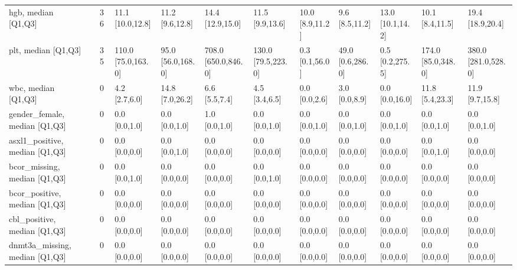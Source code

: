 \begin{tabular}{llllllllllll}
hgb, median [Q1,Q3] &    &                   36 &    11.1 [10.0,12.8] &    11.2 [9.6,12.8] &     14.4 [12.9,15.0] &     11.5 [9.9,13.6] &   10.0 [8.9,11.2] &    9.6 [8.5,11.2] &  13.0 [10.1,14.2] &     10.1 [8.4,11.5] &     19.4 [18.9,20.4] \\
plt, median [Q1,Q3] &    &                   35 &  110.0 [75.0,163.0] &  95.0 [56.0,168.0] &  708.0 [650.0,846.0] &  130.0 [79.5,223.0] &    0.3 [0.1,56.0] &  49.0 [0.6,286.0] &   0.5 [0.2,275.5] &  174.0 [85.0,348.0] &  380.0 [281.0,528.0] \\
wbc, median [Q1,Q3] &    &                    0 &       4.2 [2.7,6.0] &    14.8 [7.0,26.2] &        6.6 [5.5,7.4] &       4.5 [3.4,6.5] &     0.0 [0.0,2.6] &     3.0 [0.0,8.9] &    0.0 [0.0,16.0] &     11.8 [5.4,23.3] &      11.9 [9.7,15.8] \\
gender\_female, median [Q1,Q3] &    &                    0 &       0.0 [0.0,1.0] &      0.0 [0.0,1.0] &        1.0 [0.0,1.0] &       0.0 [0.0,1.0] &     0.0 [0.0,1.0] &     0.0 [0.0,1.0] &     0.0 [0.0,1.0] &       0.0 [0.0,1.0] &        0.0 [0.0,1.0] \\
asxl1\_positive, median [Q1,Q3] &    &                    0 &       0.0 [0.0,0.0] &      0.0 [0.0,1.0] &        0.0 [0.0,0.0] &       0.0 [0.0,0.0] &     0.0 [0.0,0.0] &     0.0 [0.0,0.0] &     0.0 [0.0,0.0] &       0.0 [0.0,1.0] &        0.0 [0.0,0.0] \\
bcor\_missing, median [Q1,Q3] &    &                    0 &       0.0 [0.0,1.0] &      0.0 [0.0,0.0] &        0.0 [0.0,0.0] &       0.0 [0.0,1.0] &     0.0 [0.0,0.0] &     0.0 [0.0,0.0] &     0.0 [0.0,0.0] &       0.0 [0.0,0.0] &        0.0 [0.0,0.0] \\
bcor\_positive, median [Q1,Q3] &    &                    0 &       0.0 [0.0,0.0] &      0.0 [0.0,0.0] &        0.0 [0.0,0.0] &       0.0 [0.0,0.0] &     0.0 [0.0,0.0] &     0.0 [0.0,0.0] &     0.0 [0.0,0.0] &       0.0 [0.0,0.0] &        0.0 [0.0,0.0] \\
cbl\_positive, median [Q1,Q3] &    &                    0 &       0.0 [0.0,0.0] &      0.0 [0.0,0.0] &        0.0 [0.0,0.0] &       0.0 [0.0,0.0] &     0.0 [0.0,0.0] &     0.0 [0.0,0.0] &     0.0 [0.0,0.0] &       0.0 [0.0,0.0] &        0.0 [0.0,0.0] \\
dnmt3a\_missing, median [Q1,Q3] &    &                    0 &       0.0 [0.0,0.0] &      0.0 [0.0,0.0] &        0.0 [0.0,0.0] &       0.0 [0.0,0.0] &     0.0 [0.0,0.0] &     0.0 [0.0,0.0] &     0.0 [0.0,0.0] &       0.0 [0.0,0.0] &        0.0 [0.0,0.0] \\

\end{tabular}
